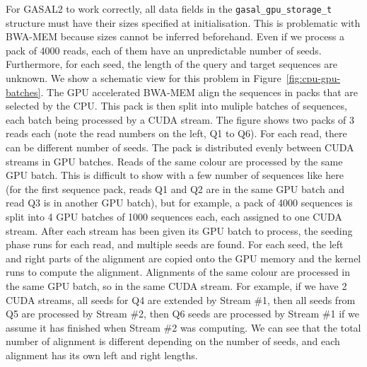 For GASAL2 to work correctly, all data fields in the \texttt{gasal\_gpu\_storage\_t} structure must have their sizes specified at initialisation. This is problematic with BWA-MEM because sizes cannot be inferred beforehand. Even if we process a pack of 4000 reads, each of them have an unpredictable number of seeds. Furthermore, for each seed, the length of the query and target sequences are unknown. We show a schematic view for this problem in Figure~\ref{fig:cpu-gpu-batches}. The GPU accelerated BWA-MEM align the sequences in packs that are selected by the CPU. This pack is then split into muliple batches of sequences, each batch being processed by a CUDA stream. The figure shows two packs of 3 reads each (note the read numbers on the left, Q1 to Q6). For each read, there can be different number of seeds. The pack is distributed evenly between CUDA streams in GPU batches. Reads of the same colour are processed by the same GPU batch. This is difficult to show with a few number of sequences like here (for the first sequence pack, reads Q1 and Q2 are in the same GPU batch and read Q3 is in another GPU batch), but for example, a pack of 4000 sequences is split into 4 GPU batches of 1000 sequences each, each assigned to one CUDA stream. After each stream has been given its GPU batch to process, the seeding phase runs for each read, and multiple seeds are found. For each seed, the left and right parts of the alignment are copied onto the GPU memory and the kernel runs to compute the alignment. Alignments of the same colour are processed in the same GPU batch, so in the same CUDA stream. For example, if we have 2 CUDA streams, all seeds for Q4 are extended by Stream \#1, then all seeds from Q5 are processed by Stream \#2, then Q6 seeds are processed by Stream \#1 if we assume it has finished when Stream \#2 was computing. We can see that the total number of alignment is different depending on the number of seeds, and each alignment has its own left and right lengths.

